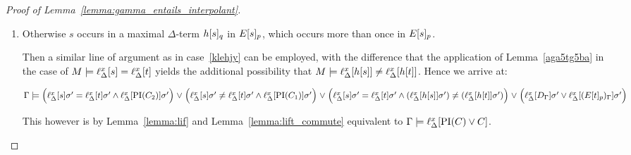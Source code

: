 \begin{proof}[Proof of Lemma~\ref{lemma:gamma_entails_interpolant}]
\begin{description}
\begin{enumerate}
					\item Otherwise $s$ occurs in a maximal $\Delta$-term $h{[s]_{q}}$ in $E{[s]_{p}}$, which occurs more than once in $E{[s]_{p}}$.

						Then a similar line of argument as in case~\ref{klehjy} can be employed, with the difference that the application of Lemma~\ref{aga5tg5ba} in the case of $M\models \ell_{\Delta}^{x}[s] = \ell_{\Delta}^{x}[t]$ yields the additional possibility that 
			$M\models \ell_{\Delta}^{x}[h[s]] \neq \ell_{\Delta}^{x}[h[t]]$.
 Hence we arrive at:

				$\Gamma \models
				\Big(\ell_{\Delta}^{x}[s]\sigma'=\ell_{\Delta}^{x}[t]\sigma' \land \ell_{\Delta}^{x}[\operatorname{PI}(C_2)]\sigma'\Big) \;{\lor}\;\allowbreak
				\Big(\ell_{\Delta}^{x}[s]\sigma'\neq\ell_{\Delta}^{x}[t]\sigma' \land \ell_{\Delta}^{x}[\operatorname{PI}(C_1)]\sigma'\Big) \;{\lor}\;\allowbreak
				\Big(\ell_{\Delta}^{x}[s]\sigma'=\ell_{\Delta}^{x}[t]\sigma' \land (\ell_{\Delta}^{x}[h[s]]\sigma') \neq (\ell_{\Delta}^{x}[h[t]]\sigma' )\Big) \;{\lor}\;\allowbreak
				\Big(\ell_{\Delta}^{x}[D_\Gamma]\sigma' \lor \ell_{\Delta}^{x}[(E{[t]_{p}})_\Gamma]\sigma'\Big)$

				This however is by Lemma~\ref{lemma:lif} and Lemma~\ref{lemma:lift_commute} equivalent to $\Gamma \entails \lifdelta{\PI(C) \lor\nolinebreak C}$.
				\qedhere
		\end{enumerate}


		\begin{comment}

			easy case:
			$\PI(C) = [ ( s=t \land \PI(C_2) ) \lor (s\neq t \land \PI(C_1)) ]\sigma$

			to show:
			$\Gamma \entails \lifdelta{ [ (( s=t \land \PI(C_2) ) \lor (s\neq t \land \PI(C_1))) \lor (D \lor E[t]) ]\sigma} $

			proof idea: either $s=t$, then also $\PI(C_2)$, or else $s\neq t$, but then also $\PI(C_1)$

			by lemma \ref{lemma:lif} for $\sigma'$ as in lemma, 
			$\Gamma \entails \lifdelta{ (( s=t \land \PI(C_2) ) \lor (s\neq t \land \PI(C_1))) \lor (D \lor E[t]) }\sigma' $

			by lemma 11 (huang)
			$\Gamma \entails [((\lifdelta{s}=\lifdelta{t} \land \lifdelta{\PI(C_2)} ) \lor (\lifdelta{s\neq t} \land \lifdelta{\PI(C_1)})) \lor (\lifdelta{D} \lor \lifdelta{E[t]}) ]\sigma' $

			reformulate:
			$\Gamma \entails ((\lifdelta{s}\sigma'=\lifdelta{t}\sigma' \land \lifdelta{\PI(C_2)}\sigma' ) \lor (\lifdelta{s}\sigma'\neq \lifdelta{t}\sigma' \land \lifdelta{\PI(C_1)}\sigma')) \lor (\lifdelta{D}\sigma' \lor \lifdelta{E[t]}\sigma') $


\end{comment}
\end{description}
\end{proof}
